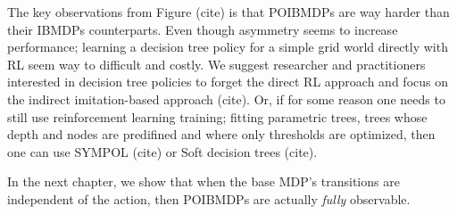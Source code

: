 The key observations from Figure (cite) is that POIBMDPs are way harder than their IBMDPs counterparts.
Even though asymmetry seems to increase performance; learning a decision tree policy for a simple grid world directly with RL seem way to difficult and costly.
We suggest researcher and practitioners interested in decision tree policies to forget the direct RL approach and focus on the indirect imitation-based approach (cite).
Or, if for some reason one needs to still use reinforcement learning training; fitting parametric trees, trees whose depth and nodes are predifined and where only thresholds are optimized, then one can use SYMPOL (cite) or Soft decision trees (cite).

In the next chapter, we show that when the base MDP's transitions are independent of the action, then POIBMDPs are actually \textit{fully} observable.